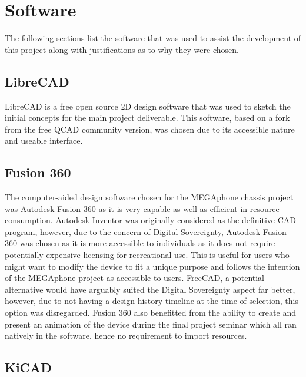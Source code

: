 \section{Software}

The following sections list the software that was used to assist the development of this project along with justifications as to why they were chosen.

\subsection{LibreCAD}

LibreCAD is a free open source 2D design software that was used to sketch the initial concepts for the main project deliverable. 
This software, based on a fork from the free QCAD community version, was chosen due to its accessible nature and useable interface.

\subsection{Fusion 360}

The computer-aided design software chosen for the MEGAphone chassis project was Autodesk Fusion 360 as it is very capable as well as efficient in resource consumption. 
Autodesk Inventor was originally considered as the definitive CAD program, however, due to the concern of Digital Sovereignty, Autodesk Fusion 360 was chosen as it is more accessible to individuals as it does not require potentially expensive licensing for recreational use. 
This is useful for users who might want to modify the device to fit a unique purpose and follows the intention of the MEGAphone project as accessible to users.
FreeCAD, a potential alternative would have arguably suited the Digital Sovereignty aspect far better, however, due to not having a design history timeline at the time of selection, this option was disregarded.
Fusion 360 also benefitted from the ability to create and present an animation of the device during the final project seminar which all ran natively in the software, hence no requirement to import resources.

\subsection{KiCAD}

